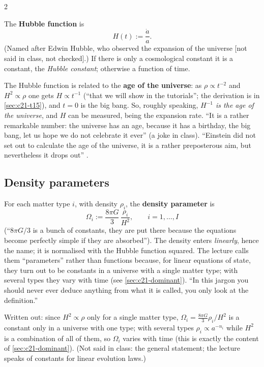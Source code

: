 \begin{paracol}{2}
\begin{definition}\label{def:c21-hubble}
The \textbf{Hubble function} is
\[
  H(t):=\frac{\dot a}{a}.
\]
(Named after Edwin Hubble, who observed the expansion of the universe [not said in class, not checked].) If there is only a cosmological constant it is a constant, the \emph{Hubble constant}; otherwise a function of time.
\end{definition}
The Hubble function is related to the \textbf{age of the universe}: as $\rho\propto t^{-2}$ and $H^2\propto\rho$ one gets $H\propto t^{-1}$ (``that we will show in the tutorials''; the derivation is in \cref{sec:c21-t15}), and $t=0$ is the big bang. So, roughly speaking, \emph{$H^{-1}$ is the age of the universe}, and $H$ can be measured, being the expansion rate. ``It is a rather remarkable number: the universe has an age, because it has a birthday, the big bang, let us hope we do not celebrate it ever'' (a joke in class). ``Einstein did not set out to calculate the age of the universe, it is a rather preposterous aim, but nevertheless it drops out'' .

\subsection{Density parameters}

\begin{definition}\label{def:c21-omega}
For each matter type $i$, with density $\rho_i$, the \textbf{density parameter} is
\[
  \Omega_i:=\frac{8\pi G}{3}\,\frac{\rho_i}{H^2},\qquad i=1,\dots,I
\]
(``$8\pi G/3$ is a bunch of constants, they are put there because the equations become perfectly simple if they are absorbed''). The density enters \emph{linearly}, hence the name; it is normalised with the Hubble function squared. The lecture calls them ``parameters'' rather than functions because, for linear equations of state, they turn out to be constants in a universe with a single matter type; with several types they vary with time (see \cref{sec:c21-dominant}). ``In this jargon you should never ever deduce anything from what it is called, you only look at the definition.''
\end{definition}

\begin{coursenote}
Written out: since $H^2\propto\rho$ only for a single matter type, $\Omega_i=\frac{8\pi G}3\rho_i/H^2$ is a constant only in a universe with one type; with several types $\rho_i\propto a^{-n_i}$ while $H^2$ is a combination of all of them, so $\Omega_i$ varies with time (this is exactly the content of \cref{sec:c21-dominant}). (Not said in class: the general statement; the lecture speaks of constants for linear evolution laws.)
\end{coursenote}


\end{paracol}
